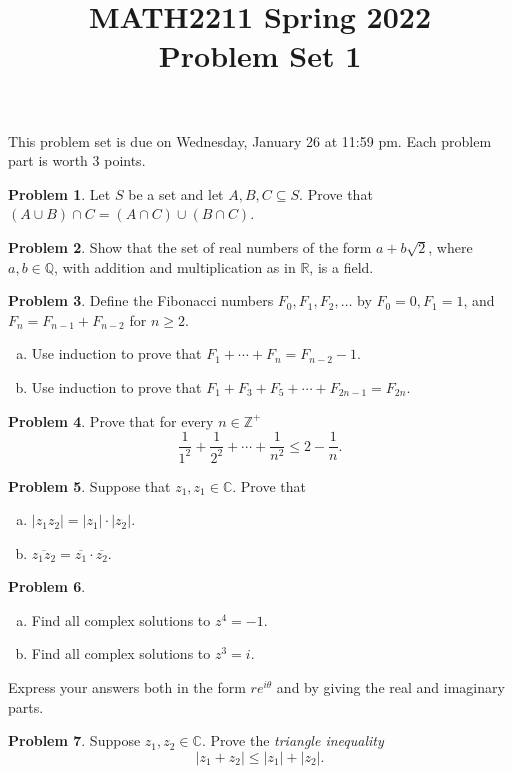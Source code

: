 \documentclass[11pt,oneside]{amsart}
\title{MATH2211 Spring 2022\\
Problem Set 1}
\theoremstyle{definition}
\newtheorem{problem}{Problem}
\newcommand{\bC}{\mathbb{C}}
\newcommand{\bQ}{\mathbb{Q}}
\newcommand{\bR}{\mathbb{R}}
\newcommand{\bZ}{\mathbb{Z}}
\begin{document}
    \maketitle
    This problem set is due on Wednesday, January 26 at 11:59 pm. Each problem part is worth 3 points.

    \begin{problem}
        Let $S$ be a set and let $A,B,C\subseteq S$. Prove that $(A\cup B)\cap C=(A\cap C)\cup(B\cap C)$.
    \end{problem}

    \begin{problem}
        Show that the set of real numbers of the form $a+b\sqrt2$, where $a,b\in\bQ$, with addition and multiplication as in $\bR$, is a field.
    \end{problem}

    \begin{problem}
        Define the Fibonacci numbers $F_0,F_1,F_2,\dots$ by $F_0=0,F_1=1$, and $F_n=F_{n-1}+F_{n-2}$ for $n\geq 2$.
        \begin{enumerate}[(a)]
            \item Use induction to prove that $F_1+\cdots+F_n=F_{n-2}-1$.
            \item Use induction to prove that $F_1+F_3+F_5+\cdots+F_{2n-1}=F_{2n}$.
        \end{enumerate}
    \end{problem}

    \begin{problem}
        Prove that for every $n\in\bZ^+$
        \[\frac 1{1^2}+\frac 1{2^2}+\cdots+\frac 1{n^2}\leq 2-\frac 1n.\]
    \end{problem}

    \begin{problem}
        Suppose that $z_1,z_1\in\bC$. Prove that
        \begin{enumerate}[(a)]
            \item $|z_1z_2|=|z_1|\cdot|z_2|$.
            \item $\overline{z_1z_2}=\overline{z_1}\cdot\overline{z_2}$.
        \end{enumerate}
    \end{problem}

    \begin{problem}\hfill
        \begin{enumerate}[(a)]
            \item Find all complex solutions to $z^4=-1$.
            \item Find all complex solutions to $z^3=i$.
        \end{enumerate}
        Express your answers both in the form $re^{i\theta}$ and by giving the real and imaginary parts.
    \end{problem}

    \begin{problem}
        Suppose $z_1,z_2\in\bC$. Prove the \emph{triangle inequality}
        \[|z_1+z_2|\leq |z_1|+|z_2|.\]
    \end{problem}
\end{document}
